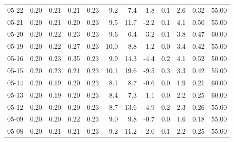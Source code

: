 \begin{threeparttable}
{\begin{tabular}{lrrrrrrrrrrr}
  05-22 &          0.20 &          0.21 &          0.21 &        0.23 &                 9.2 &                 7.4 &        1.8 &                 0.1 &              2.6 &            0.32 &                  55.00 \\
  05-21 &          0.20 &          0.21 &          0.20 &        0.23 &                 9.5 &                11.7 &       -2.2 &                 0.1 &              4.1 &            0.50 &                  55.00 \\
  05-20 &          0.20 &          0.22 &          0.23 &        0.23 &                 9.6 &                 6.4 &        3.2 &                 0.1 &              3.8 &            0.47 &                  60.00 \\
  05-19 &          0.20 &          0.22 &          0.27 &        0.23 &                10.0 &                 8.8 &        1.2 &                 0.0 &              3.4 &            0.42 &                  55.00 \\
  05-16 &          0.20 &          0.23 &          0.35 &        0.23 &                 9.9 &                14.3 &       -4.4 &                 0.2 &              4.1 &            0.52 &                  50.00 \\
  05-15 &          0.20 &          0.23 &          0.21 &        0.23 &                10.1 &                19.6 &       -9.5 &                 0.3 &              3.3 &            0.42 &                  55.00 \\
  05-14 &          0.20 &          0.19 &          0.20 &        0.23 &                 8.1 &                 8.7 &       -0.6 &                 0.0 &              1.9 &            0.21 &                  60.00 \\
  05-13 &          0.20 &          0.19 &          0.20 &        0.23 &                 8.4 &                 7.3 &        1.1 &                 0.0 &              2.2 &            0.25 &                  60.00 \\
  05-12 &          0.20 &          0.20 &          0.20 &        0.23 &                 8.7 &                13.6 &       -4.9 &                 0.2 &              2.3 &            0.26 &                  55.00 \\
  05-09 &          0.20 &          0.20 &          0.22 &        0.23 &                 9.0 &                 9.8 &       -0.7 &                 0.0 &              1.6 &            0.18 &                  55.00 \\
  05-08 &          0.20 &          0.21 &          0.21 &        0.23 &                 9.2 &                11.2 &       -2.0 &                 0.1 &              2.2 &            0.25 &                  55.00 \\

\end{tabular}}
\end{threeparttable}
